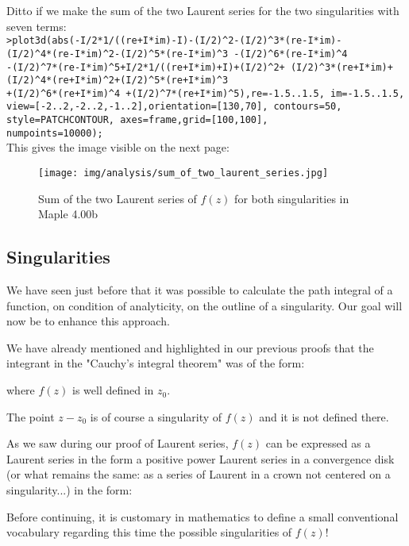 \begin{tcolorbox}[colframe=black,colback=white,sharp corners,breakable]
	Ditto if we make the sum of the two Laurent series for the two singularities with seven terms:\\
	
	\texttt{>plot3d(abs(-I/2*1/((re+I*im)-I)-(I/2)\string^2-(I/2)\string^3*(re-I*im)-\\
	(I/2)\string^4*(re-I*im)\string^2-(I/2)\string^5*(re-I*im)\string^3 -(I/2)\string^6*(re-I*im)\string^4\\
	-(I/2)\string^7*(re-I*im)\string^5+I/2*1/((re+I*im)+I)+(I/2)\string^2+
(I/2)\string^3*(re+I*im)+(I/2)\string^4*(re+I*im)\string^2+(I/2)\string^5*(re+I*im)\string^3\\
	+(I/2)\string^6*(re+I*im)\string^4
+(I/2)\string^7*(re+I*im)\string^5),re=-1.5..1.5, im=-1.5..1.5, view=[-2..2,-2..2,-1..2],orientation=[130,70], contours=50, style=PATCHCONTOUR, axes=frame,grid=[100,100],\\
numpoints=10000);}\\

	This gives the image visible on the next page:
	\begin{figure}[H]
		\centering
		\texttt{[image: img/analysis/sum\_of\_two\_laurent\_series.jpg]}
		\caption{Sum of the two Laurent series of $f(z)$ for both singularities in Maple 4.00b}
	\end{figure}
	\end{tcolorbox}
	
	\subsection{Singularities}
	We have seen just before that it was possible to calculate the path integral of a function, on condition of analyticity, on the outline of a singularity. Our goal will now be to enhance this approach.
	
	We have already mentioned and highlighted in our previous proofs that the integrant in the "Cauchy's integral theorem" was of the form:
	
	where $f(z)$ is well defined in $z_0$.
	
	The point $z-z_0$ is of course a singularity of $f(z)$ and it is not defined there.
	
	As we saw during our proof of Laurent series, $f(z)$ can be expressed as a Laurent series in the form a positive power Laurent series in a convergence disk (or what remains the same: as a series of Laurent in a crown not centered on a singularity...) in the form:
	
	Before continuing, it is customary in mathematics to define a small conventional vocabulary regarding this time the possible singularities of $f(z)$!
	
